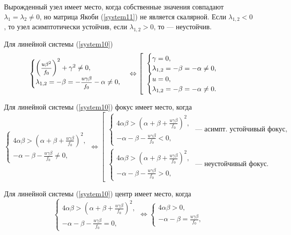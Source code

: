 \documentclass[12pt, a4paper]{article}
\begin{document}
Вырожденный узел имеет место, когда собственные значения совпадают $\lambda_1=\lambda_2\ne0$, но матрица Якоби (\ref{system11}) не является скалярной. Если $\lambda_{1,2}<0$, то узел асимптотически устойчив, если $\lambda_{1,2}>0$, то --- неустойчив.

Для линейной системы (\ref{system10}) 
\[
\begin{cases}
	\left(\hbox{\footnotesize$\displaystyle\frac{u\beta^2}{f_0}$}\right)^2+\gamma^2\ne0,\\
	\lambda_{1,2}=-\beta=-\hbox{\footnotesize$\displaystyle\frac{u\gamma \beta}{f_0}$}-\alpha\ne0,
\end{cases}
\Leftrightarrow
\left[
\begin{array}{l}
\begin{cases}
	\gamma=0,\\
	\lambda_{1,2}=-\beta=-\alpha\ne0,\\
\end{cases}\\
\begin{cases}
	u=0,\\
	\lambda_{1,2}=-\beta=-\alpha\ne0.
\end{cases}
\end{array}
\right.
\]

Для линейной системы (\ref{system10}) фокус имеет место, когда
\[
\begin{cases}
	4\alpha\beta>(\alpha+\beta+\frac{u\gamma\beta}{f_0})^2,\\
	-\alpha-\beta-\frac{u\gamma \beta}{f_0}\ne0,	
\end{cases}
\Leftrightarrow
\left[
\begin{array}{l}
	\begin{cases}
		4\alpha\beta>(\alpha+\beta+\frac{u\gamma\beta}{f_0})^2,\\
		-\alpha-\beta-\frac{u\gamma \beta}{f_0}<0,	
	\end{cases}
\text{ --- асимпт. устойчивый фокус,}\\
\begin{cases}
	4\alpha\beta>(\alpha+\beta+\frac{u\gamma\beta}{f_0})^2,\\
	-\alpha-\beta-\frac{u\gamma \beta}{f_0}>0,	
\end{cases}
\text{ --- неустойчивый фокус.}
\end{array}
\right.
\]

Для линейной системы (\ref{system10}) центр имеет место, когда
\[
\begin{cases}
	4\alpha\beta>(\alpha+\beta+\frac{u\gamma\beta}{f_0})^2,\\
	-\alpha-\beta-\frac{u\gamma \beta}{f_0}=0,	
\end{cases}
\Leftrightarrow
\begin{cases}
	4\alpha\beta>0,\\
	-\alpha-\beta=\frac{u\gamma \beta}{f_0},	
\end{cases}
\]
\end{document}
